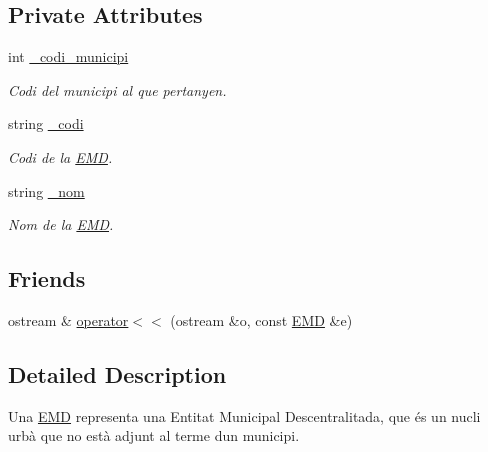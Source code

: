 \subsection*{Private Attributes}
\begin{DoxyCompactItemize}
\item 
\mbox{\label{classEMD_a23e41ce6015ce5fd269940df149a4f37}} 
int \hyperlink{classEMD_a23e41ce6015ce5fd269940df149a4f37}{\+\_\+codi\+\_\+municipi}
\begin{DoxyCompactList}\small\item\em Codi del municipi al que pertanyen. \end{DoxyCompactList}\item 
\mbox{\label{classEMD_a8e305fd79c71c7fcba37babe4010076c}} 
string \hyperlink{classEMD_a8e305fd79c71c7fcba37babe4010076c}{\+\_\+codi}
\begin{DoxyCompactList}\small\item\em Codi de la \hyperlink{classEMD}{E\+MD}. \end{DoxyCompactList}\item 
\mbox{\label{classEMD_a8eadbc1e3e6142b1a6832d42a41837ec}} 
string \hyperlink{classEMD_a8eadbc1e3e6142b1a6832d42a41837ec}{\+\_\+nom}
\begin{DoxyCompactList}\small\item\em Nom de la \hyperlink{classEMD}{E\+MD}. \end{DoxyCompactList}\end{DoxyCompactItemize}
\subsection*{Friends}
\begin{DoxyCompactItemize}
\item 
ostream \& \hyperlink{classEMD_ac11042dfa7db4251904466f77bbe61ea}{operator$<$$<$} (ostream \&o, const \hyperlink{classEMD}{E\+MD} \&e)
\end{DoxyCompactItemize}


\subsection{Detailed Description}
Una \hyperlink{classEMD}{E\+MD} representa una Entitat Municipal Descentralitada, que és un nucli urbà que no està adjunt al terme d\textquotesingle{}un municipi. 

